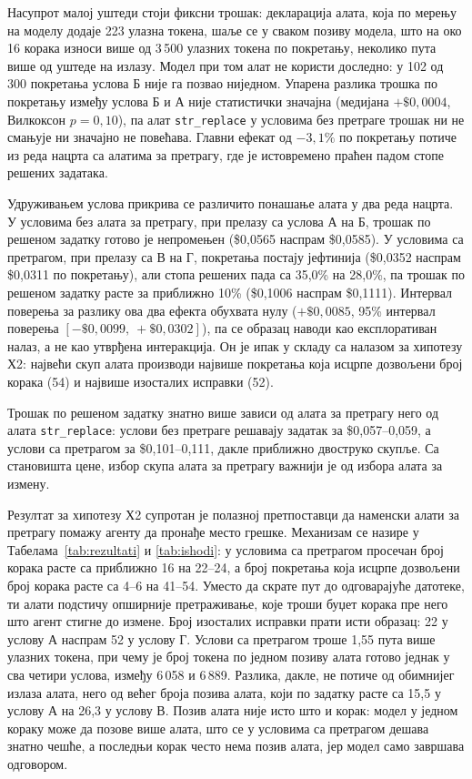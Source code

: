 \documentclass[12pt,a4paper]{report}
\begin{document}
	Насупрот малој уштеди стоји фиксни трошак: декларација алата, која по
	мерењу на моделу додаје 223 улазна токена, шаље се у сваком позиву модела,
	што на око 16 корака износи више од 3\,500 улазних токена по покретању,
	неколико пута више од уштеде на излазу. Модел при том алат не користи доследно: у
	102 од 300 покретања услова Б није га позвао ниједном. Упарена разлика
	трошка по покретању између услова Б и А није статистички значајна (медијана
	$+\$0{,}0004$, Вилкоксон $p = 0{,}10$), па алат \texttt{str\_replace} у
	условима без претраге трошак ни не смањује ни значајно не повећава. Главни
	ефекат од $-3{,}1\%$ по покретању потиче из реда нацрта са алатима за
	претрагу, где је истовремено праћен падом стопе решених задатака.
	
	Удруживањем услова прикрива се различито понашање алата у два реда нацрта.
	У условима без алата за претрагу, при прелазу са услова А на Б, трошак по
	решеном задатку готово је непромењен (\$0,0565 наспрам \$0,0585). У
	условима са претрагом, при прелазу са В на Г, покретања постају јефтинија
	(\$0,0352 наспрам \$0,0311 по покретању), али стопа решених пада са 35,0\%
	на 28,0\%, па трошак по решеном задатку расте за приближно 10\% (\$0,1006
	наспрам \$0,1111). Интервал поверења за разлику ова два ефекта обухвата
	нулу ($+\$0{,}0085$, 95\% интервал поверења $[-\$0{,}0099,\ +\$0{,}0302]$),
	па се образац наводи као експлоративан налаз, а не као утврђена интеракција.
	Он је ипак у складу са налазом за хипотезу Х2: највећи скуп алата производи
	највише покретања која исцрпе дозвољени број корака (54) и највише
	изосталих исправки (52).
	
	Трошак по решеном задатку знатно више зависи од алата за претрагу него од
	алата \texttt{str\_replace}: услови без претраге решавају задатак за
	\$0,057--0,059, а услови са претрагом за \$0,101--0,111, дакле приближно
	двоструко скупље. Са становишта цене, избор скупа алата за претрагу важнији
	је од избора алата за измену.
	
	
	Резултат за хипотезу Х2 супротан је полазној претпоставци да наменски алати
	за претрагу помажу агенту да пронађе место грешке. Механизам се назире у
	Табелама~\ref{tab:rezultati} и \ref{tab:ishodi}: у условима са претрагом
	просечан број корака расте са приближно 16 на 22--24, а број покретања која
	исцрпе дозвољени број корака расте са 4--6 на 41--54. Уместо да скрате пут
	до одговарајуће датотеке, ти алати подстичу опширније претраживање, које
	троши буџет корака пре него што агент стигне до измене. Број изосталих исправки
	прати исти образац: 22 у услову А наспрам 52 у услову Г. Услови са
	претрагом троше 1,55 пута више улазних токена, при чему је број токена по
	једном позиву алата готово једнак у сва четири услова, између 6\,058 и
	6\,889. Разлика, дакле, не потиче од обимнијег излаза алата, него од већег
	броја позива алата, који по задатку расте са 15,5 у услову А на 26,3 у
	услову В. Позив алата није исто што и корак: модел у једном кораку може да
	позове више алата, што се у условима са претрагом дешава знатно чешће, а
	последњи корак често нема позив алата, јер модел само завршава одговором.
	
\end{document}
